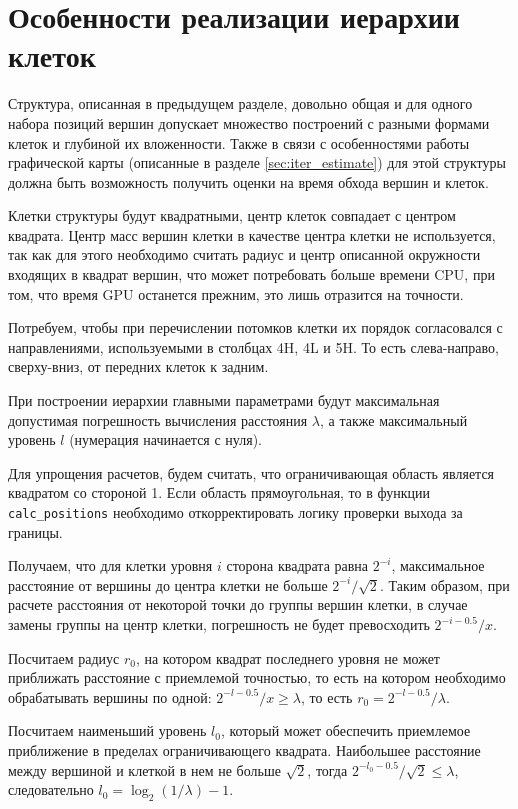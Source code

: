 \section{Особенности реализации иерархии клеток}
\label{sec:cells_implementation}

Структура, описанная в предыдущем разделе, довольно общая и для одного набора позиций вершин допускает множество построений с разными формами клеток и глубиной их вложенности. Также в связи с особенностями работы графической карты (описанные в разделе \ref{sec:iter_estimate}) для этой структуры должна быть возможность получить оценки на время обхода вершин и клеток.

Клетки структуры будут квадратными, центр клеток совпадает с центром квадрата. Центр масс вершин клетки в качестве центра клетки не используется, так как для этого необходимо считать радиус и центр описанной окружности входящих в квадрат вершин, что может потребовать больше времени CPU, при том, что время GPU останется прежним, это лишь отразится на точности.

Потребуем, чтобы при перечислении потомков клетки их порядок согласовался с направлениями, используемыми в столбцах 4H, 4L и 5H. То есть слева-направо, сверху-вниз, от передних клеток к задним.

При построении иерархии главными параметрами будут максимальная допустимая погрешность вычисления расстояния $\lambda$, а также максимальный уровень $l$ (нумерация начинается с нуля).

Для упрощения расчетов, будем считать, что ограничивающая область является квадратом со стороной 1. Если область прямоугольная, то в функции \texttt{calc\_positions} необходимо откорректировать логику проверки выхода за границы.

Получаем, что для клетки уровня $i$ сторона квадрата равна $2^{-i}$, максимальное расстояние от вершины до центра клетки не больше $2^{-i} / \sqrt{2}$. Таким образом, при расчете расстояния от некоторой точки до группы вершин клетки, в случае замены группы на центр клетки, погрешность не будет превосходить $2^{-i - 0.5} / x$.

Посчитаем радиус $r_0$, на котором квадрат последнего уровня не может приближать расстояние с приемлемой точностью, то есть на котором необходимо обрабатывать вершины по одной:  $2^{-l - 0.5} / x \ge \lambda$, то есть $r_0 = 2^{-l - 0.5} / \lambda$.

Посчитаем наименьший уровень $l_0$, который может обеспечить приемлемое приближение в пределах ограничивающего квадрата. Наибольшее расстояние между вершиной и клеткой в нем не больше $\sqrt{2}$, тогда $2^{-l_0 - 0.5} / \sqrt{2} \le \lambda$, следовательно $l_0 =  \log_2(1 / \lambda) - 1$.

